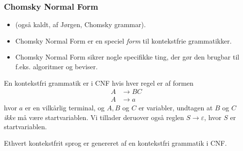 \begin{frame}[allowframebreaks]
	\frametitle{Chomsky Normal Form}

	\begin{itemize}
		\item (også kaldt, af Jørgen, Chomsky grammar).
		\item Chomsky Normal Form er en speciel \textit{form} til kontekstfrie grammatikker.
		\item Chomsky Normal Form sikrer nogle specifikke ting, der gør den brugbar til f.eks. algoritmer og beviser.
	\end{itemize}

	\begin{definition}
		En kontekstfri grammatik er i CNF hvis hver regel er af formen
		\begin{align*}
			A & \rightarrow BC \\
			A & \rightarrow a
		\end{align*}
		hvor $a$ er en vilkårlig terminal, og $A, B$ og $C$ er variabler, undtagen at $B$ og $C$ \textit{ikke} må være startvariablen. Vi tillader deruover også reglen $S \rightarrow \varepsilon$, hvor $S$ er startvariablen.
	\end{definition}

	\begin{theorem}
		Ethvert kontekstfrit sprog er genereret af en kontekstfri grammatik i CNF.
	\end{theorem}


\end{frame}
